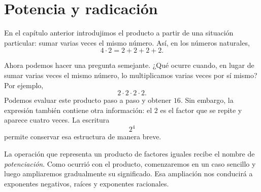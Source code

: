 \chapter{Potencia y radicación}

En el capítulo anterior introdujimos el producto a partir de una situación particular: sumar varias veces el mismo número. Así, en los números naturales,
\[
4\cdot2=2+2+2+2.
\]

Ahora podemos hacer una pregunta semejante. ¿Qué ocurre cuando, en lugar de sumar varias veces el mismo número, lo multiplicamos varias veces por sí mismo? Por ejemplo,
\[
2\cdot2\cdot2\cdot2.
\]
Podemos evaluar este producto paso a paso y obtener \(16\). Sin embargo, la expresión también contiene otra información: el \(2\) es el factor que se repite y aparece cuatro veces. La escritura
\[
2^4
\]
permite conservar esa estructura de manera breve.

La operación que representa un producto de factores iguales recibe el nombre de \emph{potenciación}. Como ocurrió con el producto, comenzaremos en un caso sencillo y luego ampliaremos gradualmente su significado. Esa ampliación nos conducirá a exponentes negativos, raíces y exponentes racionales.
















